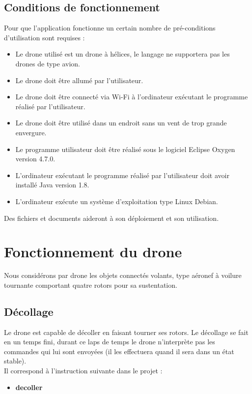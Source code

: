 \documentclass[12pt, openany]{report}
\begin{document}
\section{Conditions de fonctionnement}

Pour que l'application fonctionne un certain nombre de pré-conditions d'utilisation sont requises :
\begin{itemize}
	  \item Le drone utilisé est un drone à hélices, le langage ne supportera pas les drones de type avion.
      \item Le drone doit être allumé par l'utilisateur.
      \item Le drone doit être connecté via Wi-Fi à l'ordinateur exécutant le programme réalisé par l'utilisateur.
      \item Le drone doit être utilisé dans un endroit sans un vent de trop grande envergure.
      \item Le programme utilisateur doit être réalisé sous le logiciel Eclipse Oxygen version 4.7.0.
      \item L'ordinateur exécutant le programme réalisé par l'utilisateur doit avoir installé Java version 1.8.
      \item L'ordinateur exécute un système d'exploitation type Linux Debian.  
\end{itemize}
           
\vspace{10px}           
Des fichiers et documents aideront à son déploiement et son utilisation. 


\chapter{Fonctionnement du drone}
Nous considérons par drone les objets connectés volants, type aéronef à voilure tournante comportant quatre rotors pour sa sustentation.

\section{Décollage}
Le drone est capable de décoller en faisant tourner ses rotors. Le décollage se fait en un temps fini, durant ce laps de temps le drone n'interprète pas les commandes qui lui sont envoyées (il les effectuera quand il sera dans un état stable). \\
Il correspond à l'instruction suivante dans le projet :
\begin{itemize}
     \item \textbf{decoller}
\end{itemize}
        
\end{document}
